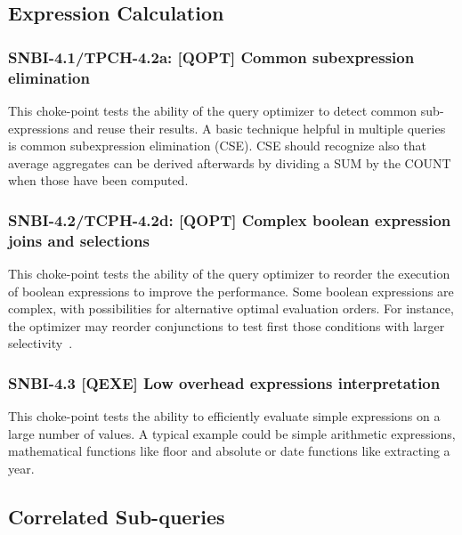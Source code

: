 \subsection{Expression Calculation}

\subsubsection{SNBI-4.1/TPCH-4.2a: [QOPT]  Common subexpression elimination}
\label{choke_point_4.1}
This choke-point tests the ability of the query optimizer to detect common sub-expressions and reuse their results. A basic technique helpful in multiple queries is common subexpression elimination (CSE).
CSE should recognize also that average aggregates can be derived afterwards by dividing a SUM by the COUNT when those have been computed.

\subsubsection{SNBI-4.2/TCPH-4.2d: [QOPT]  Complex boolean expression joins and selections}
\label{choke_point_4.2}
This choke-point tests the ability of the query optimizer to reorder the execution of boolean expressions to improve the performance. Some boolean expressions are complex, with possibilities for alternative optimal evaluation orders.
For instance, the optimizer may reorder conjunctions to test first those conditions with larger selectivity~\cite{DBLP:conf/vldb/Moerkotte98}.

\subsubsection{SNBI-4.3 [QEXE] Low overhead expressions interpretation}
\label{choke_point_4.3}
This choke-point tests the ability to efficiently evaluate simple expressions on a large number of values. A typical example could be simple arithmetic expressions, mathematical functions like floor and absolute or date functions like extracting a year.

\subsection{Correlated Sub-queries}

